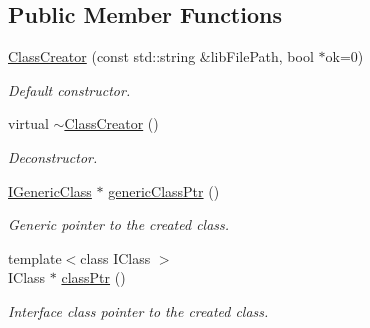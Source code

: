 \subsection*{Public Member Functions}
\begin{DoxyCompactItemize}
\item 
\hyperlink{classow__plugin__loader_1_1ClassCreator_aa18171c6438da1053868549a99d798fd}{Class\+Creator} (const std\+::string \&lib\+File\+Path, bool $\ast$ok=0)
\begin{DoxyCompactList}\small\item\em Default constructor. \end{DoxyCompactList}\item 
virtual \hyperlink{classow__plugin__loader_1_1ClassCreator_a0020c21b86a1acaf0824a07139e6ef82}{$\sim$\+Class\+Creator} ()\hypertarget{classow__plugin__loader_1_1ClassCreator_a0020c21b86a1acaf0824a07139e6ef82}{}\label{classow__plugin__loader_1_1ClassCreator_a0020c21b86a1acaf0824a07139e6ef82}

\begin{DoxyCompactList}\small\item\em Deconstructor. \end{DoxyCompactList}\item 
\hyperlink{classow__core_1_1IGenericClass}{I\+Generic\+Class} $\ast$ \hyperlink{classow__plugin__loader_1_1ClassCreator_a69208f3b46de111a3a3820a8c2bb726a}{generic\+Class\+Ptr} ()
\begin{DoxyCompactList}\small\item\em Generic pointer to the created class. \end{DoxyCompactList}\item 
{\footnotesize template$<$class I\+Class $>$ }\\I\+Class $\ast$ \hyperlink{classow__plugin__loader_1_1ClassCreator_a135ab5f75eb0d1538d02eee8c3f1278e}{class\+Ptr} ()
\begin{DoxyCompactList}\small\item\em Interface class pointer to the created class. \end{DoxyCompactList}\end{DoxyCompactItemize}
